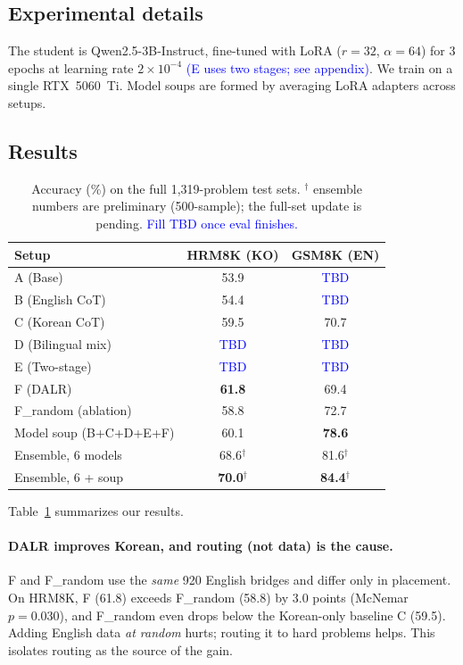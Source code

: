 \documentclass{article}
\newcommand{\note}[1]{\textcolor{blue}{{#1}}}
\begin{document}
\subsection{Experimental details}
The student is Qwen2.5-3B-Instruct, fine-tuned with LoRA ($r{=}32$,
$\alpha{=}64$) for 3 epochs at learning rate $2\times10^{-4}$
\note{(E uses two stages; see appendix)}. We train on a single
RTX~5060~Ti. Model soups are formed by averaging LoRA adapters across
setups.

\subsection{Results}
\label{sec:results}

\begin{table}[t]
\centering
\small
\begin{tabular}{lcc}
\toprule
\textbf{Setup} & \textbf{HRM8K (KO)} & \textbf{GSM8K (EN)} \\
\midrule
A (Base)              & 53.9 & \note{TBD} \\
B (English CoT)       & 54.4 & \note{TBD} \\
C (Korean CoT)        & 59.5 & 70.7 \\
D (Bilingual mix)     & \note{TBD} & \note{TBD} \\
E (Two-stage)         & \note{TBD} & \note{TBD} \\
F (DALR)              & \textbf{61.8} & 69.4 \\
F\_random (ablation)  & 58.8 & 72.7 \\
\midrule
Model soup (B+C+D+E+F) & 60.1 & \textbf{78.6} \\
\midrule
Ensemble, 6 models      & 68.6$^\dagger$ & 81.6$^\dagger$ \\
Ensemble, 6 + soup      & \textbf{70.0}$^\dagger$ & \textbf{84.4}$^\dagger$ \\
\bottomrule
\end{tabular}
\caption{Accuracy (\%) on the full 1{,}319-problem test sets.
$^\dagger$ ensemble numbers are preliminary (500-sample); the full-set
update is pending. \note{Fill TBD once eval finishes.}}
\label{tab:main}
\end{table}

Table~\ref{tab:main} summarizes our results.

\paragraph{DALR improves Korean, and routing (not data) is the cause.}
F and F\_random use the \emph{same} 920 English bridges and differ only
in placement. On HRM8K, F (61.8) exceeds F\_random (58.8) by 3.0 points
(McNemar $p{=}0.030$), and F\_random even drops below the Korean-only
baseline C (59.5). Adding English data \emph{at random} hurts; routing it
to hard problems helps. This isolates routing as the source of the gain.
\end{document}
